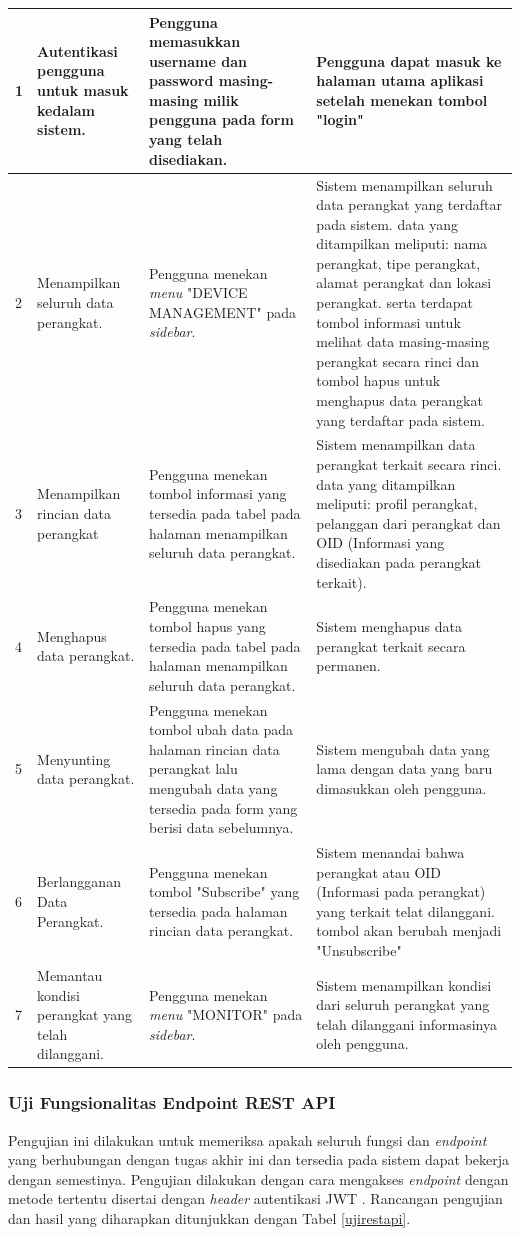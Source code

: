 \begin{longtable}{|p{}|p{}|p{}|p{}|}
                    1 & Autentikasi pengguna untuk masuk kedalam sistem. & Pengguna memasukkan username dan password masing-masing milik pengguna pada form yang telah disediakan. & Pengguna dapat masuk ke halaman utama aplikasi setelah menekan tombol "login"\\ \hline
                    2 & Menampilkan seluruh data perangkat. & Pengguna menekan \textit{menu} "DEVICE MANAGEMENT" pada \textit{sidebar}. & Sistem menampilkan seluruh data perangkat yang terdaftar pada sistem. data yang ditampilkan meliputi: nama perangkat, tipe perangkat, alamat perangkat dan lokasi perangkat. serta terdapat tombol informasi untuk melihat data masing-masing perangkat secara rinci dan tombol hapus untuk menghapus data perangkat yang terdaftar pada sistem. \\ \hline
                    3 & Menampilkan rincian data perangkat & Pengguna menekan tombol informasi yang tersedia pada tabel pada halaman menampilkan seluruh data perangkat. & Sistem menampilkan data perangkat terkait secara rinci. data yang ditampilkan meliputi: profil perangkat, pelanggan dari perangkat dan OID (Informasi yang disediakan pada perangkat terkait). \\ \hline
                    4 & Menghapus data perangkat. & Pengguna menekan tombol hapus yang tersedia pada tabel pada halaman menampilkan seluruh data perangkat. & Sistem menghapus data perangkat terkait secara permanen. \\ \hline
					5 & Menyunting data perangkat. & Pengguna menekan tombol ubah data pada halaman rincian data perangkat lalu mengubah data yang tersedia pada form yang berisi data sebelumnya. & Sistem mengubah data yang lama dengan data yang baru dimasukkan oleh pengguna. \\ \hline
                    6 & Berlangganan Data Perangkat. & Pengguna menekan tombol "Subscribe" yang tersedia pada halaman rincian data perangkat. & Sistem menandai bahwa perangkat atau OID (Informasi pada perangkat) yang terkait telat dilanggani. tombol akan berubah menjadi "Unsubscribe"\\ \hline
                    7 & Memantau kondisi perangkat yang telah dilanggani. & Pengguna menekan \textit{menu} "MONITOR" pada \textit{sidebar}. & Sistem menampilkan kondisi dari seluruh perangkat yang telah dilanggani informasinya oleh pengguna. \\ \hline
				\end{longtable}
            
        \subsubsection{Uji Fungsionalitas Endpoint REST API}
        	Pengujian ini dilakukan untuk memeriksa apakah seluruh fungsi dan \textit{endpoint} yang berhubungan dengan tugas akhir ini dan tersedia pada sistem dapat bekerja dengan semestinya. Pengujian dilakukan dengan cara mengakses \textit{endpoint} dengan metode tertentu disertai dengan \textit{header} autentikasi JWT . Rancangan pengujian dan hasil yang diharapkan ditunjukkan dengan Tabel \ref{ujirestapi}.
            
